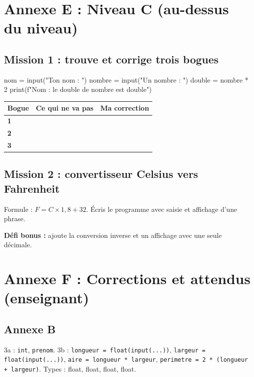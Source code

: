 \documentclass[11pt,a4paper]{article}
\begin{document}
\newpage
\section*{Annexe E : Niveau C (au-dessus du niveau)}

\subsection*{Mission 1 : trouve et corrige trois bogues}
\begin{python}[niveauC.py]
nom = input("Ton nom : ")
nombre = input("Un nombre : ")
double = nombre * 2
print(f"{Nom} : le double de {nombre} est {double}")
\end{python}

\begin{tabularx}{\linewidth}{>{\bfseries}p{1.6cm}Y Y}
\toprule
Bogue & Ce qui ne va pas & Ma correction\\
 & & \\ 2 & & \\ 3 & & \\
\bottomrule
\end{tabularx}

\subsection*{Mission 2 : convertisseur Celsius vers Fahrenheit}
Formule : $F = C \times 1{,}8 + 32$. Écris le programme avec saisie et affichage d'une phrase.\\
\lig \lig \lig

\textbf{Défi bonus :} ajoute la conversion inverse et un affichage avec une seule décimale.

\newpage
\section*{Annexe F : Corrections et attendus (enseignant)}

\subsection*{Annexe B}
3a : \texttt{int}, \texttt{prenom}. 3b : \texttt{longueur = float(input(...))}, \texttt{largeur = float(input(...))}, \texttt{aire = longueur * largeur}, \texttt{perimetre = 2 * (longueur + largeur)}. Types : float, float, float, float.
\end{document}
